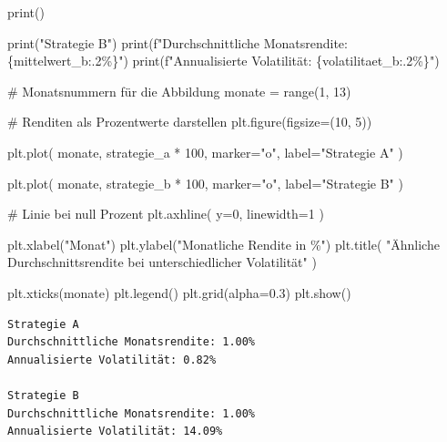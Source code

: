 \documentclass[
  ngerman,
  a4paper,
  DIV=11,
  oneside]{scrreprt}
\newenvironment{Shaded}{\begin{snugshade}}{\end{snugshade}}
\newcommand{\BuiltInTok}[1]{\textcolor[rgb]{0.00,0.23,0.31}{#1}}
\newcommand{\CommentTok}[1]{\textcolor[rgb]{0.37,0.37,0.37}{#1}}
\newcommand{\DecValTok}[1]{\textcolor[rgb]{0.68,0.00,0.00}{#1}}
\newcommand{\FloatTok}[1]{\textcolor[rgb]{0.68,0.00,0.00}{#1}}
\newcommand{\NormalTok}[1]{\textcolor[rgb]{0.00,0.23,0.31}{#1}}
\newcommand{\OperatorTok}[1]{\textcolor[rgb]{0.37,0.37,0.37}{#1}}
\newcommand{\SpecialCharTok}[1]{\textcolor[rgb]{0.37,0.37,0.37}{#1}}
\newcommand{\SpecialStringTok}[1]{\textcolor[rgb]{0.13,0.47,0.30}{#1}}
\newcommand{\StringTok}[1]{\textcolor[rgb]{0.13,0.47,0.30}{#1}}
\begin{document}
\begin{Shaded}
\begin{Highlighting}[]
\BuiltInTok{print}\NormalTok{()}

\BuiltInTok{print}\NormalTok{(}\StringTok{"Strategie B"}\NormalTok{)}
\BuiltInTok{print}\NormalTok{(}\SpecialStringTok{f"Durchschnittliche Monatsrendite: }\SpecialCharTok{\{}\NormalTok{mittelwert\_b}\SpecialCharTok{:.2\%\}}\SpecialStringTok{"}\NormalTok{)}
\BuiltInTok{print}\NormalTok{(}\SpecialStringTok{f"Annualisierte Volatilität: }\SpecialCharTok{\{}\NormalTok{volatilitaet\_b}\SpecialCharTok{:.2\%\}}\SpecialStringTok{"}\NormalTok{)}


\CommentTok{\# Monatsnummern für die Abbildung}
\NormalTok{monate }\OperatorTok{=} \BuiltInTok{range}\NormalTok{(}\DecValTok{1}\NormalTok{, }\DecValTok{13}\NormalTok{)}


\CommentTok{\# Renditen als Prozentwerte darstellen}
\NormalTok{plt.figure(figsize}\OperatorTok{=}\NormalTok{(}\DecValTok{10}\NormalTok{, }\DecValTok{5}\NormalTok{))}

\NormalTok{plt.plot(}
\NormalTok{    monate,}
\NormalTok{    strategie\_a }\OperatorTok{*} \DecValTok{100}\NormalTok{,}
\NormalTok{    marker}\OperatorTok{=}\StringTok{"o"}\NormalTok{,}
\NormalTok{    label}\OperatorTok{=}\StringTok{"Strategie A"}
\NormalTok{)}

\NormalTok{plt.plot(}
\NormalTok{    monate,}
\NormalTok{    strategie\_b }\OperatorTok{*} \DecValTok{100}\NormalTok{,}
\NormalTok{    marker}\OperatorTok{=}\StringTok{"o"}\NormalTok{,}
\NormalTok{    label}\OperatorTok{=}\StringTok{"Strategie B"}
\NormalTok{)}

\CommentTok{\# Linie bei null Prozent}
\NormalTok{plt.axhline(}
\NormalTok{    y}\OperatorTok{=}\DecValTok{0}\NormalTok{,}
\NormalTok{    linewidth}\OperatorTok{=}\DecValTok{1}
\NormalTok{)}

\NormalTok{plt.xlabel(}\StringTok{"Monat"}\NormalTok{)}
\NormalTok{plt.ylabel(}\StringTok{"Monatliche Rendite in \%"}\NormalTok{)}
\NormalTok{plt.title(}
    \StringTok{"Ähnliche Durchschnittsrendite bei unterschiedlicher Volatilität"}
\NormalTok{)}

\NormalTok{plt.xticks(monate)}
\NormalTok{plt.legend()}
\NormalTok{plt.grid(alpha}\OperatorTok{=}\FloatTok{0.3}\NormalTok{)}
\NormalTok{plt.show()}
\end{Highlighting}
\end{Shaded}

\begin{verbatim}
Strategie A
Durchschnittliche Monatsrendite: 1.00%
Annualisierte Volatilität: 0.82%

Strategie B
Durchschnittliche Monatsrendite: 1.00%
Annualisierte Volatilität: 14.09%
\end{verbatim}
\end{document}
